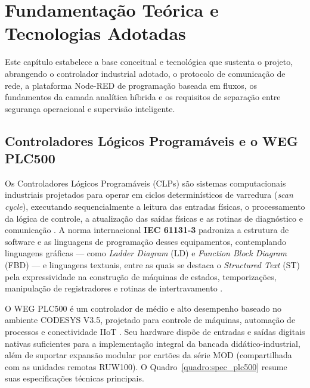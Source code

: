 
\chapter{Fundamentação Teórica e Tecnologias Adotadas}
\label{cap:fundamentacao}

Este capítulo estabelece a base conceitual e tecnológica que sustenta o projeto, abrangendo o controlador industrial adotado, o protocolo de comunicação de rede, a plataforma Node-RED de programação baseada em fluxos, os fundamentos da camada analítica híbrida e os requisitos de separação entre segurança operacional e supervisão inteligente.

\section{Controladores Lógicos Programáveis e o WEG PLC500}
\label{sec:fund_plc500}

Os Controladores Lógicos Programáveis (CLPs) são sistemas computacionais industriais projetados para operar em ciclos determinísticos de varredura (\textit{scan cycle}), executando sequencialmente a leitura das entradas físicas, o processamento da lógica de controle, a atualização das saídas físicas e as rotinas de diagnóstico e comunicação \cite{georgini_automacao, moraes_castrucci}. A norma internacional \textbf{IEC 61131-3} padroniza a estrutura de software e as linguagens de programação desses equipamentos, contemplando linguagens gráficas --- como \textit{Ladder Diagram} (LD) e \textit{Function Block Diagram} (FBD) --- e linguagens textuais, entre as quais se destaca o \textit{Structured Text} (ST) pela expressividade na construção de máquinas de estados, temporizações, manipulação de registradores e rotinas de intertravamento \cite{iec_61131_3}.

O WEG PLC500 é um controlador de médio e alto desempenho baseado no ambiente CODESYS V3.5, projetado para controle de máquinas, automação de processos e conectividade IIoT \cite{weg_plc500_manual, codesys_v35}. Seu hardware dispõe de entradas e saídas digitais nativas suficientes para a implementação integral da bancada didático-industrial, além de suportar expansão modular por cartões da série MOD (compartilhada com as unidades remotas RUW100). O Quadro~\ref{quadro:spec_plc500} resume suas especificações técnicas principais.

